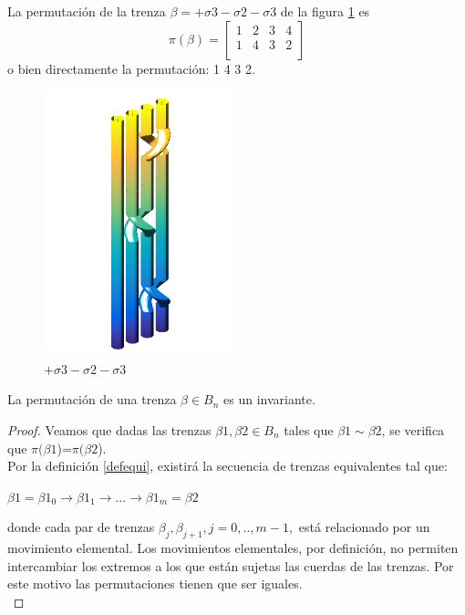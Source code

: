 \documentclass[14pt]{extarticle}
\begin{document}
La permutación de la trenza $\beta = +\sigma3-\sigma2-\sigma3$ de la figura \ref{perm1} es \[\pi(\beta)=\begin{bmatrix}
1 & 2 & 3 & 4\\
1 & 4 & 3 & 2 \\
\end{bmatrix}\] o bien directamente la permutación: 1 4 3 2.\\
\begin{figure}[h!]
	\centering
	\includegraphics[width=5.5cm]{itrenzas/4c3.png}
	\caption{$+\sigma3-\sigma2-\sigma3$}
	\label{perm1} 
\end{figure}

\begin{pro}
    La permutación de una trenza $\beta \in B_{n}$ es un invariante. 
    \begin{proof}
    	Veamos que dadas las trenzas $\beta1,\beta2 \in B_{n}$ tales que $\beta1 \sim \beta2$, se verifica que $\pi(\beta1$)=$\pi(\beta2$).\\
    	
    	Por la definición \ref{defequi}, existirá la secuencia de trenzas equivalentes tal que: 
    	\begin{center}
    		$ \beta1 = \beta1_{0} \rightarrow \beta1_{1} \rightarrow ... \rightarrow \beta1_{m}=\beta2$ 
    	\end{center}
    	donde cada par de trenzas $ \beta_{j}, \beta_{j+1}, j=0,..,m-1, $ está relacionado por un movimiento elemental. Los movimientos elementales, por definición, no permiten intercambiar los extremos a los que están sujetas las cuerdas de las trenzas. Por este motivo las permutaciones tienen que ser iguales. \\
    \end{proof}
\end{pro}
\end{document}
